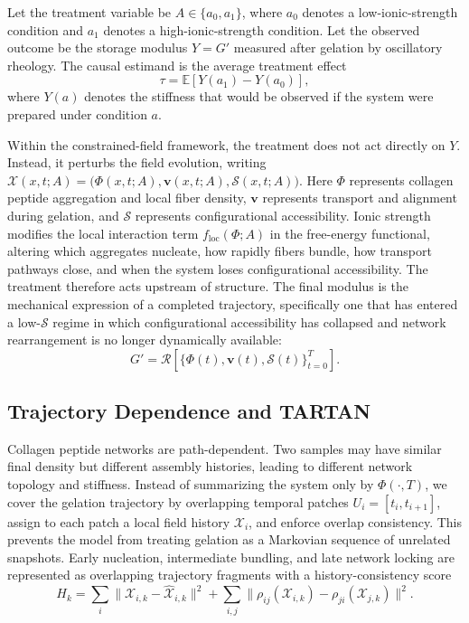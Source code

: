 \documentclass[11pt, a4paper, twocolumn]{article}
\newcommand{\X}{\mathcal{X}}
\newcommand{\Sfield}{\mathcal{S}}
\begin{document}
Let the treatment variable be $A \in \{a_0,a_1\}$, where $a_0$ denotes a
low-ionic-strength condition and $a_1$ denotes a high-ionic-strength condition.
Let the observed outcome be the storage modulus $Y = G'$ measured after gelation
by oscillatory rheology. The causal estimand is the average treatment effect
\[
    \tau
    =
    \mathbb{E}\!\left[Y(a_1)-Y(a_0)\right],
\]
where $Y(a)$ denotes the stiffness that would be observed if the system were
prepared under condition $a$.

Within the constrained-field framework, the treatment does not act directly on
$Y$. Instead, it perturbs the field evolution, writing
$\X(x,t;A) = \bigl(\Phi(x,t;A),\mathbf{v}(x,t;A),\Sfield(x,t;A)\bigr)$.
Here $\Phi$ represents collagen peptide aggregation and local fiber density,
$\mathbf{v}$ represents transport and alignment during gelation, and $\Sfield$
represents configurational accessibility. Ionic strength modifies the local
interaction term $f_{\mathrm{loc}}(\Phi;A)$ in the free-energy functional,
altering which aggregates nucleate, how rapidly fibers bundle, how transport
pathways close, and when the system loses configurational accessibility. The
treatment therefore acts upstream of structure. The final modulus is the
mechanical expression of a completed trajectory, specifically one that has
entered a low-$\Sfield$ regime in which configurational accessibility has
collapsed and network rearrangement is no longer dynamically available:
\[
    G'
    =
    \mathcal{R}
    \left[
        \{\Phi(t),\mathbf{v}(t),\Sfield(t)\}_{t=0}^{T}
    \right].
\]

\subsection{Trajectory Dependence and TARTAN}

Collagen peptide networks are path-dependent. Two samples may have similar
final density but different assembly histories, leading to different network
topology and stiffness. Instead of summarizing the system only by
$\Phi(\cdot,T)$, we cover the gelation trajectory by overlapping temporal
patches $U_i = [t_i,t_{i+1}]$, assign to each patch a local field history
$\X_i$, and enforce overlap consistency. This prevents the model from treating
gelation as a Markovian sequence of unrelated snapshots. Early nucleation,
intermediate bundling, and late network locking are represented as overlapping
trajectory fragments with a history-consistency score
\[
    H_k
    =
    \sum_i
    \|\X_{i,k}-\widehat{\X}_{i,k}\|^2
    +
    \sum_{i,j}
    \|\rho_{ij}(\X_{i,k})-\rho_{ji}(\X_{j,k})\|^2.
\]
\end{document}
